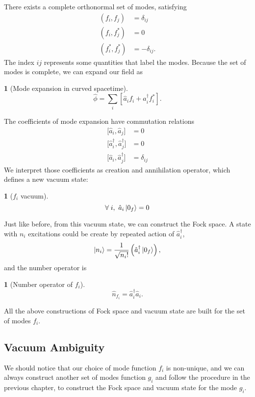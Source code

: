 \documentclass[12pt]{article}
\numberwithin{equation}{section}
\theoremstyle{1style}
\newtheorem{cthm}[equation]{}
\begin{document}
There exists a complete orthonormal set of modes, satisfying
\begin{align}\label{orf}
  \left(f_{i},f_{j}\right)     & =\delta_{ij}   \\
  \left(f_{i},f^*_{j}\right)   & =0             \\
  \left(f^*_{i},f^*_{j}\right) & =-\delta_{ij}.
\end{align}
The index \(ij\) represents some quantities that label the modes.
Because the set of modes is complete, we can expand our field as
\begin{cthm}[Mode expansion in curved spacetime]\label{cme}
  \[\hat{\phi}=\sum_i\left[\hat{a}_i f_i+\hat{a}_i^\dagger f_i^*\right].\]
\end{cthm}
The coefficients of mode expansion have commutation relations
\begin{align}
  \bigl[\hat{a}_{i},\hat{a}_{j}\bigr]                     & =0           \\
  \bigl[\hat{a}^{\dagger}_{i},\hat{a}^{\dagger}_{j}\bigr] & =0           \\
  \bigl[\hat{a}_{i},\hat{a}^{\dagger}_{j}\bigr]           & =\delta_{ij}
\end{align}
We interpret those coefficients as creation and annihilation operator, which defines a new vacuum state:
\begin{cthm}[\(f_i\) vacuum]
  \[\forall\;i,\ \hat{a}_i\ket{0_f}=0\]
\end{cthm}
Just like before, from this vacuum state, we can construct the Fock space.
A state with \(n_i\) excitations could be create by repeated action of \(\hat{a}^\dagger_i\),
\begin{equation}
  \ket{n_i}=\frac{1}{\sqrt{n_i!}}\left(\hat{a}_i^{\dagger}\ket{0_f}\right),
\end{equation}
and the number operator is
\begin{cthm}[Number operator of \(f_i\)]
  \[\hat{n}_{f_i}=\hat{a}_i^\dagger \hat{a}_i.\]
\end{cthm}

All the above constructions of Fock space and vacuum state are built for the set of modes \(f_i\).


\subsection{Vacuum Ambiguity}
We should notice that our choice of mode function \(f_i\) is non-unique, and we can always construct another set of modes function
\(g_i\) and follow the procedure in the previous chapter, to construct the Fock space and vacuum state for the mode \(g_i\).
\end{document}
